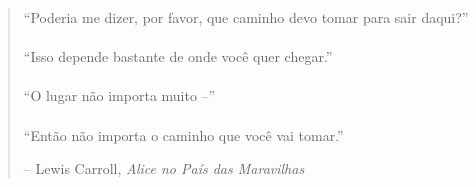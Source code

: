 
\newpage \vspace*{4cm}
\thispagestyle{empty}
\begin{quotation}
\begin{center}
  \large
  \enquote{Poderia me dizer, por favor, que caminho devo tomar para sair daqui?} \\~\\
  \enquote{Isso depende bastante de onde você quer chegar.} \\~\\
  \enquote{O lugar não importa muito --} \\~\\
  \enquote{Então não importa o caminho que você vai tomar.}
\end{center}
\begin{flushright} -- Lewis Carroll, \textit{Alice no País das Maravilhas}\end{flushright}
\end{quotation}
